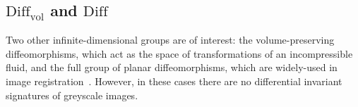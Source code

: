 \documentclass{artjlt}
\def\R{\mathbb{R}}
\begin{document}





\subsection{$\mathrm{Diff}_{\mathrm{vol}}$ and $\mathrm{Diff}$}

Two other infinite-dimensional groups are of interest: the volume-preserving diffeomorphisms, which act as the space of transformations of an incompressible fluid, and the full group of planar diffeomorphisms, which are widely-used in image registration~\citep{YounesBook}. However, in these cases there are no differential invariant signatures of greyscale images.
\end{document}
